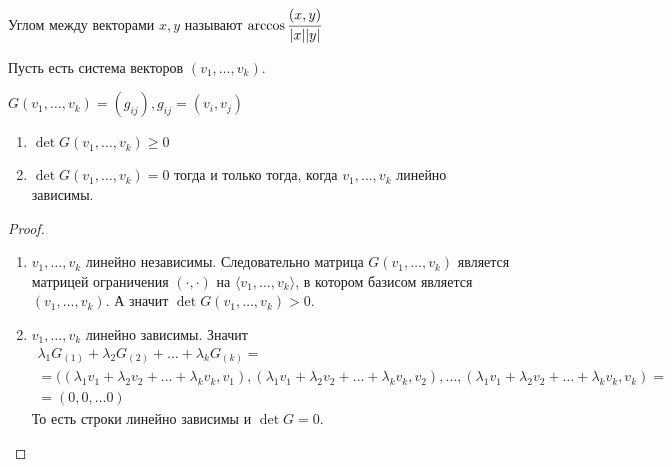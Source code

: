 \begin{Def}
	Углом между векторами $x,y$ называют $\arccos \cfrac{(x,y)}{|x||y|}$
\end{Def}
Пусть есть система векторов $(v_1, \ldots, v_k)$.
\begin{Def}
	$G(v_1,\ldots, v_k) = (g_{ij}), g_{ij} = (v_i,v_j)$
\end{Def}
\begin{Suggestion}
	\begin{enumerate}
		\item $\det G(v_1, \ldots, v_k) \geqslant 0$
		\item $\det G(v_1, \ldots, v_k) = 0$ тогда и только тогда, когда $v_1, \ldots, v_k$ линейно зависимы.
	\end{enumerate}
\end{Suggestion}
\begin{proof}
	\ \\
	\begin{enumerate}
		\item $v_1, \ldots, v_k$ линейно независимы. Следовательно матрица $G(v_1, \ldots, v_k)$ является матрицей ограничения $(\cdot, \cdot)$ на $\langle v_1, \ldots, v_k\rangle$, в котором базисом является $(v_1, \ldots, v_k)$. А значит $\det G(v_1, \ldots, v_k) > 0$.
		\item $v_1, \ldots, v_k$  линейно зависимы. Значит
		\begin{gather*}
			\lambda_1 G_{(1)} + \lambda_2 G_{(2)} + \ldots + \lambda_k G_{(k)} =\\= ((\lambda_1v_1 + \lambda_2 v_2 + \ldots + \lambda_kv_k, v_1),(\lambda_1v_1 + \lambda_2 v_2 + \ldots + \lambda_kv_k, v_2), \ldots ,(\lambda_1v_1 + \lambda_2 v_2 + \ldots + \lambda_kv_k, v_k) = \\
			= (0, 0, \ldots 0)
		\end{gather*}
		То есть строки линейно зависимы и $\det G = 0$.
	\end{enumerate}
\end{proof}
